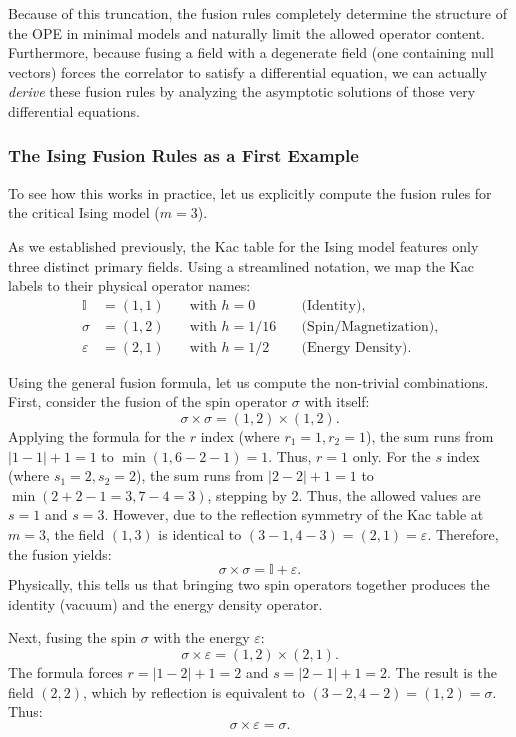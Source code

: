 Because of this truncation, the fusion rules completely determine the structure of the OPE in minimal models and naturally limit the allowed operator content. Furthermore, because fusing a field with a degenerate field (one containing null vectors) forces the correlator to satisfy a differential equation, we can actually \textit{derive} these fusion rules by analyzing the asymptotic solutions of those very differential equations.

\subsubsection{The Ising Fusion Rules as a First Example}

To see how this works in practice, let us explicitly compute the fusion rules for the critical Ising model (\(m=3\)).

As we established previously, the Kac table for the Ising model features only three distinct primary fields. Using a streamlined notation, we map the Kac labels to their physical operator names:
\[
    \begin{aligned}
        \mathbb{I}  & = (1,1) \quad & \text{with } h = 0 \quad    & \text{(Identity)},           \\
        \sigma      & = (1,2) \quad & \text{with } h = 1/16 \quad & \text{(Spin/Magnetization)}, \\
        \varepsilon & = (2,1) \quad & \text{with } h = 1/2 \quad  & \text{(Energy Density)}.
    \end{aligned}
\]

Using the general fusion formula, let us compute the non-trivial combinations.
First, consider the fusion of the spin operator \(\sigma\) with itself:
\[
    \sigma \times \sigma = (1,2) \times (1,2).
\]
Applying the formula for the \(r\) index (where \(r_1=1, r_2=1\)), the sum runs from \(|1-1|+1 = 1\) to \(\min(1, 6-2-1) = 1\). Thus, \(r=1\) only.
For the \(s\) index (where \(s_1=2, s_2=2\)), the sum runs from \(|2-2|+1 = 1\) to \(\min(2+2-1=3, 7-4=3)\), stepping by 2. Thus, the allowed values are \(s=1\) and \(s=3\).
However, due to the reflection symmetry of the Kac table at \(m=3\), the field \((1,3)\) is identical to \((3-1, 4-3) = (2,1) = \varepsilon\). Therefore, the fusion yields:
\[
    \sigma \times \sigma = \mathbb{I} + \varepsilon.
\]
Physically, this tells us that bringing two spin operators together produces the identity (vacuum) and the energy density operator.

Next, fusing the spin \(\sigma\) with the energy \(\varepsilon\):
\[
    \sigma \times \varepsilon = (1,2) \times (2,1).
\]
The formula forces \(r = |1-2|+1 = 2\) and \(s = |2-1|+1 = 2\). The result is the field \((2,2)\), which by reflection is equivalent to \((3-2, 4-2) = (1,2) = \sigma\). Thus:
\[
    \sigma \times \varepsilon = \sigma.
\]

